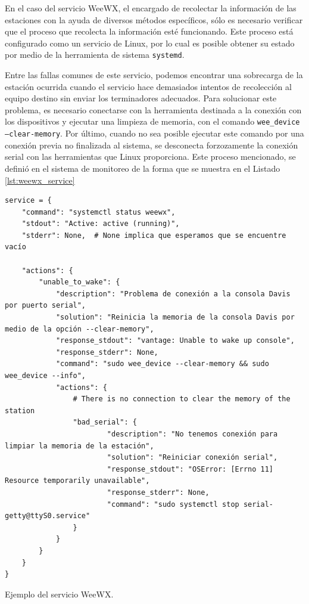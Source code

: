 En el caso del servicio WeeWX, el encargado de recolectar la información de las estaciones con la ayuda de diversos métodos específicos, sólo es necesario verificar que el proceso que recolecta la información esté funcionando. Este proceso está configurado como un servicio de Linux, por lo cual es posible obtener su estado por medio de la herramienta de sistema \texttt{systemd}.

Entre las fallas comunes de este servicio, podemos encontrar una sobrecarga de la estación ocurrida cuando el servicio hace demasiados intentos de recolección al equipo destino sin enviar los terminadores adecuados. Para solucionar este problema, es necesario conectarse con la herramienta destinada a la conexión con los dispositivos y ejecutar una limpieza de memoria, con el comando \texttt{wee\_device --clear-memory}. Por último, cuando no sea posible ejecutar este comando por una conexión previa no finalizada al sistema, se desconecta forzozamente la conexión serial con las herramientas que Linux proporciona. Este proceso mencionado, se definió en el sistema de monitoreo de la forma que se muestra en el Listado \ref{lst:weewx_service}


\begin{listing}
\begin{verbatim}
service = {
    "command": "systemctl status weewx",
    "stdout": "Active: active (running)",
    "stderr": None,  # None implica que esperamos que se encuentre vacío

    "actions": {
        "unable_to_wake": {
            "description": "Problema de conexión a la consola Davis por puerto serial",
            "solution": "Reinicia la memoria de la consola Davis por medio de la opción --clear-memory",
            "response_stdout": "vantage: Unable to wake up console",
            "response_stderr": None,
            "command": "sudo wee_device --clear-memory && sudo wee_device --info",
            "actions": {
                # There is no connection to clear the memory of the station
                "bad_serial": {
                        "description": "No tenemos conexión para limpiar la memoria de la estación",
                        "solution": "Reiniciar conexión serial",
                        "response_stdout": "OSError: [Errno 11] Resource temporarily unavailable",
                        "response_stderr": None,
                        "command": "sudo systemctl stop serial-getty@ttyS0.service"
                }
            }
        }
    }
}
\end{verbatim}
\caption{Ejemplo del servicio WeeWX.}
\label{lst:weewx_service}
\end{listing}

